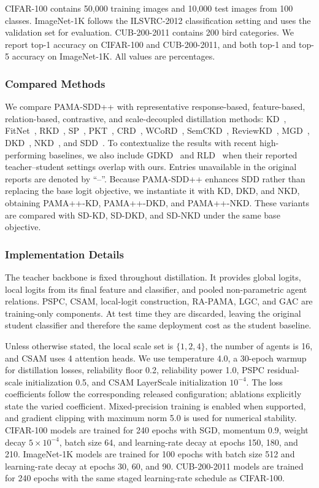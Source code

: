 \documentclass[a4paper,fleqn]{cas-dc}
\begin{document}
CIFAR-100 contains 50,000 training images and 10,000 test images from 100
classes. ImageNet-1K follows the ILSVRC-2012 classification setting and uses
the validation set for evaluation. CUB-200-2011 contains 200 bird categories.
We report top-1 accuracy on CIFAR-100 and CUB-200-2011, and both top-1 and
top-5 accuracy on ImageNet-1K. All values are percentages.

\subsubsection{Compared Methods}
We compare PAMA-SDD++ with representative response-based, feature-based,
relation-based, contrastive, and scale-decoupled distillation methods:
KD~\cite{hinton2015distilling}, FitNet~\cite{romero2015fitnets},
RKD~\cite{park2019relational}, SP~\cite{tung2019similarity},
PKT~\cite{passalis2018learning}, CRD~\cite{tian2020contrastive},
WCoRD~\cite{chen2021wasserstein}, SemCKD~\cite{chen2021semckd},
ReviewKD~\cite{chen2021distilling}, MGD~\cite{yang2022masked},
DKD~\cite{zhao2022decoupled}, NKD~\cite{yang2023knowledge}, and
SDD~\cite{wei2024scaled}. To contextualize the results with recent
high-performing baselines, we also include GDKD~\cite{zheng2025rethinking}
and RLD~\cite{sun2025knowledge} when their reported teacher--student settings
overlap with ours. Entries unavailable in the original reports are denoted by
``--''. Because PAMA-SDD++ enhances SDD rather than replacing the base logit
objective, we instantiate it with KD, DKD, and NKD, obtaining PAMA++-KD,
PAMA++-DKD, and PAMA++-NKD. These variants are compared with SD-KD, SD-DKD,
and SD-NKD under the same base objective.

\subsubsection{Implementation Details}
The teacher backbone is fixed throughout distillation. It provides global
logits, local logits from its final feature and classifier, and pooled
non-parametric agent relations. PSPC, CSAM, local-logit construction, RA-PAMA,
LGC, and GAC are training-only components. At test time they are discarded,
leaving the original student classifier and therefore the same deployment cost
as the student baseline.

Unless otherwise stated, the local scale set is $\{1,2,4\}$, the number of
agents is 16, and CSAM uses 4 attention heads. We use temperature 4.0, a
30-epoch warmup for distillation losses, reliability floor 0.2, reliability
power 1.0, PSPC residual-scale initialization 0.5, and CSAM LayerScale
initialization $10^{-4}$. The loss coefficients follow the corresponding
released configuration; ablations explicitly state the varied coefficient.
Mixed-precision training is enabled when supported, and gradient clipping with
maximum norm 5.0 is used for numerical stability. CIFAR-100 models are trained
for 240 epochs with SGD, momentum 0.9, weight decay $5\times10^{-4}$, batch
size 64, and learning-rate decay at epochs 150, 180, and 210. ImageNet-1K
models are trained for 100 epochs with batch size 512 and learning-rate decay
at epochs 30, 60, and 90. CUB-200-2011 models are trained for 240 epochs with
the same staged learning-rate schedule as CIFAR-100.
\end{document}
